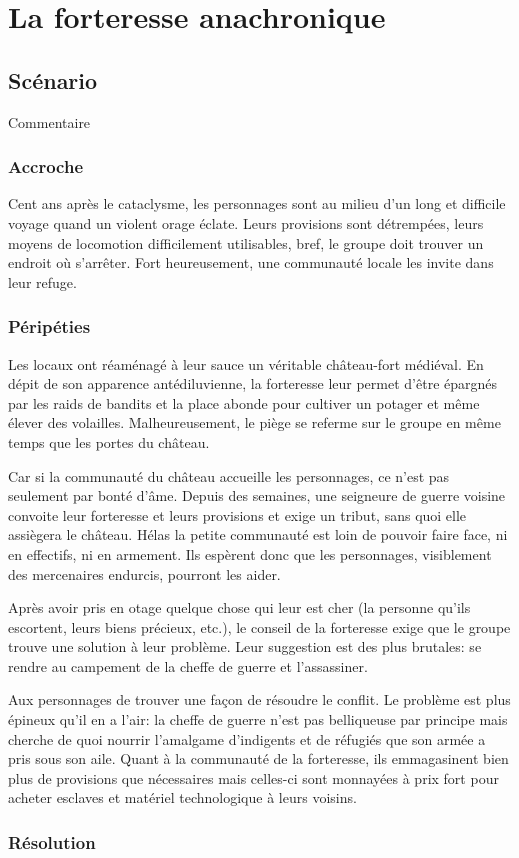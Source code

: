 \chapter{La forteresse anachronique}

\section{Scénario}

Commentaire

\subsection{Accroche}

Cent ans après le cataclysme, les personnages sont au milieu d'un long et difficile voyage quand un violent orage éclate.
Leurs provisions sont détrempées, leurs moyens de locomotion difficilement utilisables, bref, le groupe doit trouver un endroit où s'arrêter.
Fort heureusement, une communauté locale les invite dans leur refuge.


\subsection{Péripéties}

Les locaux ont réaménagé à leur sauce un véritable château-fort médiéval.
En dépit de son apparence antédiluvienne, la forteresse leur permet d'être épargnés par les raids de bandits et la place abonde pour cultiver un potager et même élever des volailles.
Malheureusement, le piège se referme sur le groupe en même temps que les portes du château.

Car si la communauté du château accueille les personnages, ce n'est pas seulement par bonté d'âme.
Depuis des semaines, une seigneure de guerre voisine convoite leur forteresse et leurs provisions et exige un tribut, sans quoi elle assiègera le château.
Hélas la petite communauté est loin de pouvoir faire face, ni en effectifs, ni en armement.
Ils espèrent donc que les personnages, visiblement des mercenaires endurcis, pourront les aider.

Après avoir pris en otage quelque chose qui leur est cher (la personne qu'ils escortent, leurs biens précieux, etc.), le conseil de la forteresse exige que le groupe trouve une solution à leur problème.
Leur suggestion est des plus brutales: se rendre au campement de la cheffe de guerre et l'assassiner.

Aux personnages de trouver une façon de résoudre le conflit.
Le problème est plus épineux qu'il en a l'air: la cheffe de guerre n'est pas belliqueuse par principe mais cherche de quoi nourrir l'amalgame d'indigents et de réfugiés que son armée a pris sous son aile.
Quant à la communauté de la forteresse, ils emmagasinent bien plus de provisions que nécessaires mais celles-ci sont monnayées à prix fort pour acheter esclaves et matériel technologique à leurs voisins.

\subsection{Résolution}

